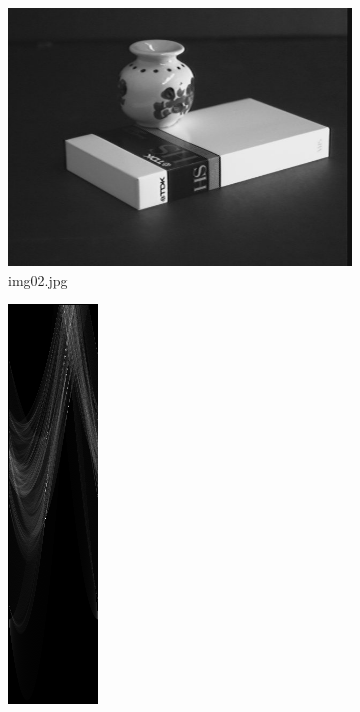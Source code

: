 \documentclass{article}
\begin{document}
	\begin{figure}[htb!]
		\centering
		\begin{subfigure}[t]{0.3\textwidth}
			\centering
			\includegraphics[width=\textwidth]{img/img02.jpg}
			\caption{\label{fig:img-02}img02.jpg}
		\end{subfigure}
		\hfill
		\begin{subfigure}[t]{0.3\textwidth}
			\centering
			\includegraphics[height=\textwidth]{img/hough02.png}

\end{subfigure}
\end{figure}
\end{document}

